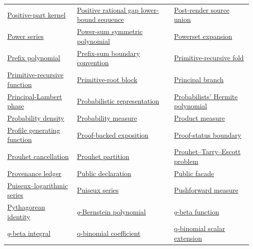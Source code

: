 \documentclass[11pt,oneside]{article}
\begin{document}
\begin{longtable}{L{0.31\textwidth}L{0.31\textwidth}L{0.31\textwidth}}
\hyperlink{gls:positive-part-kernel}{Positive-part kernel} & \hyperlink{gls:positive-rational-gap-sequence}{Positive rational gap lower-bound sequence} & \hyperlink{gls:post-render-source-union}{Post-render source union} \\
\hyperlink{gls:power-series}{Power series} & \hyperlink{gls:power-sum-symmetric-polynomial}{Power-sum symmetric polynomial} & \hyperlink{gls:powerset-expansion}{Powerset expansion} \\
\hyperlink{gls:prefix-polynomial}{Prefix polynomial} & \hyperlink{gls:prefix-sum-boundary-convention}{Prefix-sum boundary convention} & \hyperlink{gls:primitive-recursive-fold}{Primitive-recursive fold} \\
\hyperlink{gls:primitive-recursive-function}{Primitive-recursive function} & \hyperlink{gls:primitive-root-block}{Primitive-root block} & \hyperlink{gls:principal-branch}{Principal branch} \\
\hyperlink{gls:principal-lambert-phase}{Principal-Lambert phase} & \hyperlink{gls:probabilistic-representation}{Probabilistic representation} & \hyperlink{gls:probabilists-hermite-polynomial}{Probabilists' Hermite polynomial} \\
\hyperlink{gls:probability-density}{Probability density} & \hyperlink{gls:probability-measure}{Probability measure} & \hyperlink{gls:product-measure}{Product measure} \\
\hyperlink{gls:profile-generating-function}{Profile generating function} & \hyperlink{gls:proof-backed-exposition}{Proof-backed exposition} & \hyperlink{gls:proof-status-boundary}{Proof-status boundary} \\
\hyperlink{gls:prouhet-cancellation}{Prouhet cancellation} & \hyperlink{gls:prouhet-partition}{Prouhet partition} & \hyperlink{gls:prouhet-tarry-escott-problem}{Prouhet--Tarry--Escott problem} \\
\hyperlink{gls:provenance-ledger}{Provenance ledger} & \hyperlink{gls:public-declaration}{Public declaration} & \hyperlink{gls:public-facade}{Public facade} \\
\hyperlink{gls:puiseux-log-series}{Puiseux--logarithmic series} & \hyperlink{gls:puiseux-series}{Puiseux series} & \hyperlink{gls:pushforward-measure}{Pushforward measure} \\
\hyperlink{gls:pythagorean-identity}{Pythagorean identity} & \hyperlink{gls:q-bernstein-polynomial}{\(q\)-Bernstein polynomial} & \hyperlink{gls:q-beta-function}{\(q\)-beta function} \\
\hyperlink{gls:q-beta-integral}{\(q\)-beta integral} & \hyperlink{gls:q-binomial-coefficient}{q-binomial coefficient} & \hyperlink{gls:q-binomial-scalar-extension}{q-binomial scalar extension} \\

\end{longtable}
\end{document}
